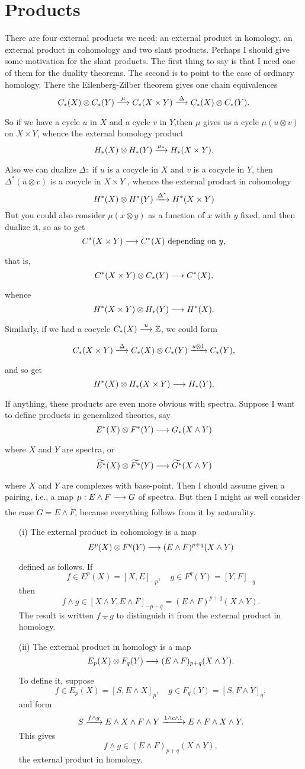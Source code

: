 \documentclass[../main]{subfiles}
\begin{document}
\chapter{Products}
\label{sec:p3c09}
\par There are four external products we need: an external product in homology, an external product in cohomology and two slant products. Perhaps I should give some motivation for the slant products. The first thing to say is that I need one of them for the duality theorems. The second is to point to the case of ordinary homology. There the Eilenberg-Zilber theorem gives one chain equivalences
\[C_\ast(X) \otimes C_\ast(Y) \lar{\mu} C_\ast(X\times Y)\lar{\Delta}C_\ast(X) \otimes C_\ast(Y).\]
So if we have a cycle $u$ in $X$ and a cycle $v$ in $Y$,then $\mu$ gives us a cycle $\mu(u\otimes v)$ on $X \times Y$, whence the external homology product
\[H_\ast(X) \otimes H_\ast(Y) \lar{\mu_\ast}H_\ast(X\times Y).\]
Also we can dualize $\Delta:$ if $u$ is a cocycle in $X$ and $v$ is a cocycle in $Y$, then $\Delta^\ast(u\otimes v)$ is a cocycle in $X \times Y$ , whence the external product in cohomology
\[H^\ast(X)\otimes H^\ast(Y) \lar{\Delta^\ast}H^\ast(X\times Y)\]
But you could also consider $\mu(x\otimes y)$ as a function of $x$ with $y$ fixed, and then dualize it, so as to get
\[C^\ast(X\times Y) \lar{} C^\ast(X) \text{ depending on $y$,}\]
that is,
\[C^\ast(X \times Y) \otimes C_\ast(Y) \lar{} C^\ast(X),\]
whence
\[H^\ast(X\times Y)\otimes H_\ast(Y) \lar{} H^\ast(X).\]
Similarly, if we had a cocycle $C_\ast(X) \lar{u} \bZ$, we could form
\[C_\ast(X \times Y) \lar{\Delta} C_\ast(X)\otimes C_\ast(Y) \lar{u\otimes 1} C_\ast(Y),\]
and so get
\[H^\ast(X)\otimes H_\ast(X\times Y) \lar{} H_\ast(Y).\]
If anything, these products are even more obvious with spectra.  Suppose I want to define products in generalized theories, say
\[E^\ast(X) \otimes F^\ast(Y) \lar {} G_\ast(X \wedge Y)\]
where $X$ and $Y$ are spectra, or
\[\widetilde {E^\ast}(X) \otimes \widetilde {F^\ast}(Y) \lar{} \widetilde {G^\ast}(X \wedge Y)\]
where $X$ and $Y$ are complexes with base-point. Then I should assume given a pairing, i.e., a map $\mu : E \wedge F \lar {} G$ of spectra. But then I might as well consider the case $G = E \wedge F$, because everything follows from it by naturality.
\begin{enumerate}
	\item[(i)] The external product in cohomology is a map \[E^p(X) \otimes F^q(Y) \lar{} (E \wedge F)^{p + q} (X \wedge Y)\] defined as follows. If \[f \in E^p(X) = [X, E]_{-p}, \quad g \in F^q(Y) = [Y, F]_{-q}\] then \[f \wedge g \in [X \wedge Y, E \wedge F]_{-p - q} = (E \wedge F)^{p + q}(X \wedge Y).\] The result is written $f \barwedge g$ to distinguish it from the external product in homology.
	\item[(ii)] The external product in homology is a map \[E_p(X) \otimes F_q(Y) \lar {} (E \wedge F)_{p + q}(X \wedge Y).\] To define it, suppose \[f \in E_p(X) = [S, E \wedge X]_p, \quad g \in F_q(Y) = [S, F \wedge Y]_q,\] and form \[S \vra{f \wedge g} E \wedge X \wedge F \wedge Y \vra {1 \wedge c \wedge 1} E \wedge F \wedge X \wedge Y.\] This gives \[f \underline \wedge g \in (E \wedge F)_{p + q}(X \wedge Y),\] the external product in homology.
\end{enumerate}
\end{document}
